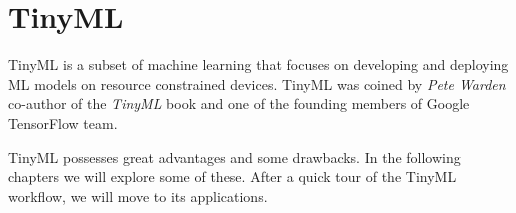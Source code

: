 \documentclass[../../main]{subfiles}
\begin{document}
\section{TinyML} \label{sec:}

TinyML is a subset of machine learning that focuses on developing and
deploying ML models on resource constrained devices. TinyML was coined
by \emph{Pete Warden} co-author of the \emph{TinyML} book and one of the
founding members of Google TensorFlow team.

TinyML possesses great advantages and some drawbacks. In the following
chapters we will explore some of these. After a quick tour of the TinyML
workflow, we will move to its applications.
\end{document}
